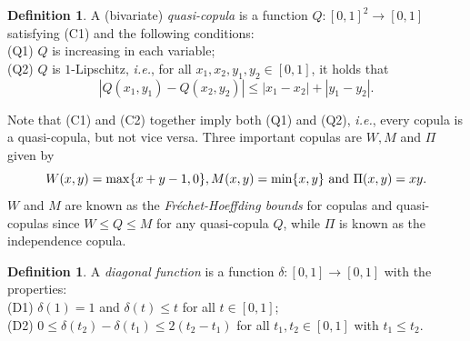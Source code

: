 \documentclass[12pt]{article}
\theoremstyle{plain}
\theoremstyle{definition}
\newtheorem{dfnt}[thrm]{Definition}%
\begin{document}
\begin{dfnt}\cite{N06}
A (bivariate) \emph{quasi-copula} is a function $Q: [0, 1]^2\to [0, 1]$ satisfying (C1) and the following conditions:\\
(Q1) $Q$ is increasing in each variable;\\
(Q2) $Q$ is $1$-Lipschitz, \emph{i.e.}, for all $x_1, x_2, y_1, y_2\in [0, 1]$, it holds that
\[
|Q(x_1, y_1)-Q(x_2, y_2)|\leq |x_1-x_2|+|y_1-y_2|.
\]
\end{dfnt}
Note that (C1) and (C2) together imply both (Q1) and (Q2), \emph{i.e.}, every copula is a quasi-copula, but not vice versa.
Three important copulas are $W, M$ and $\Pi$ given by
\[W(x, y)=\max\{x+y-1, 0\}, M(x, y)=\min\{x, y\} \ {\rm and} \ \Pi(x, y)=xy.\]
$W$ and $M$ are known as the \emph{Fr\'{e}chet-Hoeffding bounds} for copulas and quasi-copulas since $W\leq Q\leq M$
for any quasi-copula $Q$, while $\Pi$ is known as the independence copula.

\begin{dfnt}\cite{NQRU04}
A \emph{diagonal function} is a function $\delta: [0, 1]\to [0, 1]$ with the properties:\\
(D1) $\delta(1)=1$ and $\delta(t)\leq t$ for all $t\in [0, 1]$;\\
(D2) $0\leq \delta(t_2)-\delta(t_1)\leq 2(t_2-t_1)$ for all $t_1, t_2\in [0, 1]$ with $t_1\leq t_2$.
\end{dfnt}
\end{document}
